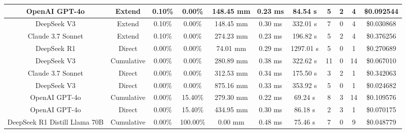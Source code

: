 \begin{landscape}
\begin{table}[H]
\begin{center}
\begin{tabular}{|c|c|c|c|c|c|c|c|c|c|c|}
    \hline
    OpenAI GPT-4o & Extend & 0.10\% & 0.00\% & 148.45 mm & 0.23 ms & 84.54 s & 5 & 2 & 4 & \$0.092544 \\
    \hline
    DeepSeek V3 & Extend & 0.10\% & 0.00\% & 148.45 mm & 0.30 ms & 332.01 s & 7 & 0 & 4 & \$0.030868 \\
    \hline
    Claude 3.7 Sonnet & Extend & 0.10\% & 0.00\% & 274.23 mm & 0.23 ms & 196.82 s & 5 & 2 & 4 & \$0.376256 \\
    \hline
    DeepSeek R1 & Direct & 0.00\% & 0.00\% & 74.01 mm & 0.29 ms & 1297.01 s & 5 & 0 & 1 & \$0.270689 \\
    \hline
    DeepSeek V3 & Cumulative & 0.00\% & 0.00\% & 280.89 mm & 0.38 ms & 322.62 s & 11 & 0 & 14 & \$0.067010 \\
    \hline
    Claude 3.7 Sonnet & Direct & 0.00\% & 0.00\% & 312.53 mm & 0.34 ms & 175.50 s & 3 & 2 & 1 & \$0.342063 \\
    \hline
    DeepSeek V3 & Direct & 0.00\% & 0.00\% & 875.16 mm & 0.33 ms & 353.92 s & 5 & 0 & 1 & \$0.024682 \\
    \hline
    OpenAI GPT-4o & Cumulative & 0.00\% & 15.40\% & 279.30 mm & 0.22 ms & 69.24 s & 8 & 3 & 14 & \$0.109576 \\
    \hline
    OpenAI GPT-4o & Direct & 0.00\% & 15.40\% & 434.95 mm & 0.30 ms & 86.18 s & 2 & 3 & 1 & \$0.070175 \\
    \hline
    DeepSeek R1 Distill Llama 70B & Cumulative & 0.00\% & 100.00\% & 0.00 mm & 0.48 ms & 75.46 s & 7 & 0 & 9 & \$0.048779 \\
    \hline
\end{tabular}
\label{Results-Position-2-5}
\end{center}
\end{table}


\end{landscape}
